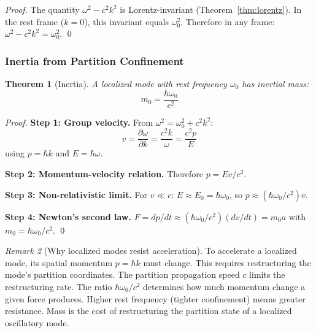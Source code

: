\documentclass[twocolumn,10pt,a4paper]{article}
\newtheorem{theorem}{Theorem}[section]
\theoremstyle{definition}
\theoremstyle{remark}
\newtheorem{remark}[theorem]{Remark}
\begin{document}
\begin{proof}
The quantity $\omega^2 - c^2k^2$ is Lorentz-invariant (Theorem~\ref{thm:lorentz}). In the rest frame ($k = 0$), this invariant equals $\omega_0^2$. Therefore in any frame: $\omega^2 - c^2k^2 = \omega_0^2$. \qed
\end{proof}

\subsubsection{Inertia from Partition Confinement}

\begin{theorem}[Inertia]
\label{thm:inertia}
A localized mode with rest frequency $\omega_0$ has inertial mass:
\begin{equation}
    \boxed{m_0 = \frac{\hbar\omega_0}{c^2}}
    \label{eq:mass}
\end{equation}
\end{theorem}

\begin{proof}
\textbf{Step 1: Group velocity.} From $\omega^2 = \omega_0^2 + c^2k^2$:
\begin{equation}
    v = \frac{\partial\omega}{\partial k} = \frac{c^2k}{\omega} = \frac{c^2p}{E}
\end{equation}
using $p = \hbar k$ \citep{debroglie1924} and $E = \hbar\omega$.

\textbf{Step 2: Momentum-velocity relation.} Therefore $p = Ev/c^2$.

\textbf{Step 3: Non-relativistic limit.} For $v \ll c$: $E \approx E_0 = \hbar\omega_0$, so $p \approx (\hbar\omega_0/c^2)v$.

\textbf{Step 4: Newton's second law.} $F = dp/dt \approx (\hbar\omega_0/c^2)(dv/dt) = m_0 a$ with $m_0 = \hbar\omega_0/c^2$. \qed
\end{proof}

\begin{remark}[Why localized modes resist acceleration]
To accelerate a localized mode, its spatial momentum $p = \hbar k$ must change. This requires restructuring the mode's partition coordinates. The partition propagation speed $c$ limits the restructuring rate. The ratio $\hbar\omega_0/c^2$ determines how much momentum change a given force produces. Higher rest frequency (tighter confinement) means greater resistance. Mass is the cost of restructuring the partition state of a localized oscillatory mode.
\end{remark}
\end{document}
